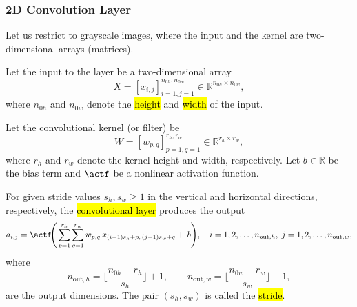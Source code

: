 \subsubsection{2D Convolution Layer}
Let us restrict to grayscale images, where the input and the kernel are two-dimensional arrays (matrices).

Let the input to the layer be a two-dimensional array
$$
X = [x_{i,j}]_{i=1,j=1}^{n_{0h},n_{0w}} \in \mathbb{R}^{n_{0h}\times n_{0w}},
$$
where $n_{0h}$ and $n_{0w}$ denote the \hl{height} and \hl{width} of the input.

Let the convolutional kernel (or filter) be
$$
W = [w_{p,q}]_{p=1,q=1}^{r_h, r_w} \in \mathbb{R}^{r_h\times r_w},
$$
where $r_h$ and $r_w$ denote the kernel height and width, respectively.
Let $b \in \mathbb{R}$ be the bias term and $\actf$ be a nonlinear activation function.
\begin{definition}

For given stride values $s_h, s_w \ge 1$ in the vertical and horizontal directions, respectively,
the \hl{convolutional layer} produces the output
$$
a_{i,j} = \actf\!\Bigg(
\sum_{p=1}^{r_h}\sum_{q=1}^{r_w}
w_{p,q}\, x_{(i-1)s_h + p,\,(j-1)s_w + q} +\,b
\Bigg),
\quad
i=1,2,\ldots,n_{\text{out},h}, \;
j=1,2,\ldots,n_{\text{out},w},
$$
where
$$
n_{\text{out},h} = 
\Big\lfloor \frac{n_{0h} - r_h}{s_h} \Big\rfloor + 1,
\qquad
n_{\text{out},w} =
\Big\lfloor \frac{n_{0w} - r_w}{s_w} \Big\rfloor + 1,
$$
are the output dimensions. The pair $(s_h, s_w)$ is called the \hl{stride}.
\end{definition}

